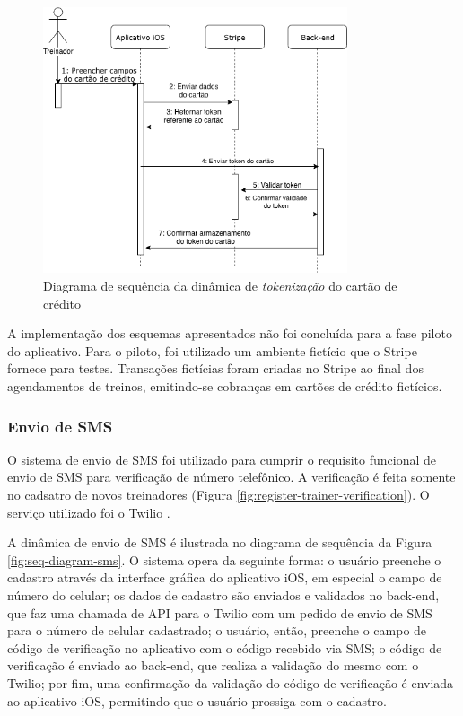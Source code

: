 \begin{figure}[H]
    \centering
    \includegraphics[width=0.8\textwidth]{pfc/figuras/seq-diagram-token.png}
    \caption{Diagrama de sequência da dinâmica de \textit{tokenização} do cartão de crédito}
    \label{fig:seq-diagram-token}
\end{figure}

A implementação dos esquemas apresentados não foi concluída para a fase piloto do aplicativo. Para o piloto, foi utilizado um ambiente fictício que o Stripe fornece para testes. Transações fictícias foram criadas no Stripe ao final dos agendamentos de treinos, emitindo-se cobranças em cartões de crédito fictícios.

\subsubsection{Envio de SMS}
O sistema de envio de SMS foi utilizado para cumprir o requisito funcional de envio de SMS para verificação de número telefônico. A verificação é feita somente no cadsatro de novos treinadores (Figura \ref{fig:register-trainer-verification}). O serviço utilizado foi o Twilio \cite{twilio}.

A dinâmica de envio de SMS é ilustrada no diagrama de sequência da Figura \ref{fig:seq-diagram-sms}. O sistema opera da seguinte forma: o usuário preenche o cadastro através da interface gráfica do aplicativo iOS, em especial o campo de número do celular; os dados de cadastro são enviados e validados no back-end, que faz uma chamada de API para o Twilio com um pedido de envio de SMS para o número de celular cadastrado; o usuário, então, preenche o campo de código de verificação no aplicativo com o código recebido via SMS; o código de verificação é enviado ao back-end, que realiza a validação do mesmo com o Twilio; por fim, uma confirmação da validação do código de verificação é enviada ao aplicativo iOS, permitindo que o usuário prossiga com o cadastro.

